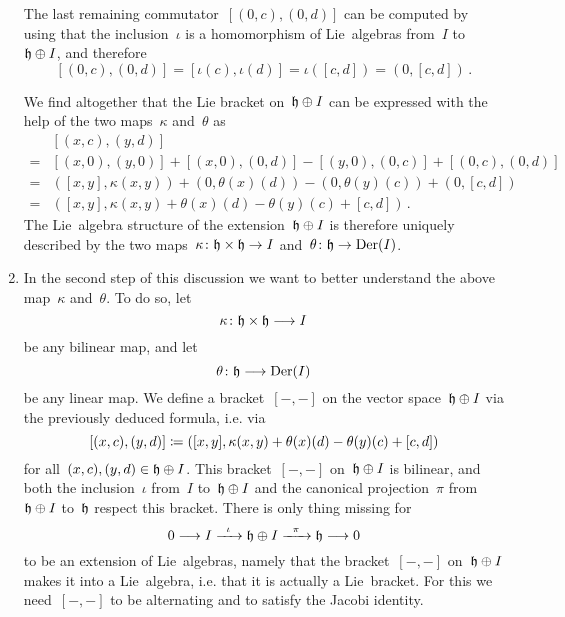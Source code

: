 \begin{fluff}
\begin{enumerate}
      The last remaining commutator~$[(0,c), (0,d)]$ can be computed by using that the inclusion~$\iota$ is a homomorphism of Lie~algebras from~$I$ to~$\mathfrak{h} \oplus I$, and therefore
      \[
        [(0,c), (0,d)]
        =
        [\iota(c), \iota(d)]
        =
        \iota([c,d])
        =
        (0, [c,d]) \,.
      \]

      We find altogether that the Lie bracket on~$\mathfrak{h} \oplus I$ can be expressed with the help of the two maps~$\kappa$ and~$\theta$ as
      \begin{align*}
        {}&
        [ (x,c), (y,d) ]
        \\
        ={}&
        [(x,0), (y,0)]
        + [(x,0), (0,d)]
        - [(y,0), (0,c)]
        + [(0,c), (0,d)]
        \\
        ={}&
          ( [x,y], \kappa(x,y) )
        + ( 0, \theta(x)(d) )
        - ( 0, \theta(y)(c) )
        + ( 0, [c,d] )
        \\
        ={}&
        (
          [x,y],
          \kappa(x,y) + \theta(x)(d) - \theta(y)(c) + [c,d]
        ) \,.
      \end{align*}
      The Lie~algebra structure of the extension~$\mathfrak{h} \oplus I$ is therefore uniquely described by the two maps~$\kappa \colon \hlie \times \hlie \to I$ and~$\theta \colon \hlie \to \Der(I)$.
    \item
      In the second step of this discussion we want to better understand the above map~$\kappa$ and~$\theta$.
      To do so, let
      \[
        \kappa
        \colon
        \hlie \times \hlie
        \to
        I
      \]
      be any bilinear map, and let
      \[
        \theta
        \colon
        \hlie
        \to
        \Der(I)
      \]
      be any linear map.
      We define a bracket~$[-,-]$ on the vector space~$\mathfrak{h} \oplus I$ via the previously deduced formula, i.e. via
      \begin{equation}
        \label{definition of lie bracket depending on kappa and theta}
        [(x,c), (y,d)]
        \coloneqq
        (
          [x,y] ,
          \kappa(x,y) + \theta(x)(d) - \theta(y)(c) + [c,d]
        )
      \end{equation}
      for all~$(x,c), (y,d) \in \mathfrak{h} \oplus I$.
      This bracket~$[-,-]$ on~$\mathfrak{h} \oplus I$ is bilinear, and both the inclusion~$\iota$ from~$I$ to~$\mathfrak{h} \oplus I$ and the canonical projection~$\pi$ from~$\mathfrak{h} \oplus I$ to~$\mathfrak{h}$ respect this bracket.
      There is only thing missing for
      \[
        0
        \to
        I
        \xto{\iota}
        \hlie \oplus I
        \xto{\pi}
        \hlie
        \to
        0
      \]
      to be an extension of Lie~algebras, namely that the bracket~$[-,-]$ on~$\mathfrak{h} \oplus I$ makes it into a Lie~algebra, i.e. that it is actually a Lie~bracket.
      For this we need~$[-,-]$ to be alternating and to satisfy the Jacobi identity.


\end{enumerate}
\end{fluff}
